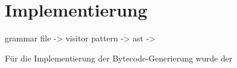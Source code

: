 \chapter{Implementierung}
\label{cha:implementation}


grammar file -> visitor pattern -> ast -> 

Für die Implementierung der Bytecode-Generierung wurde der 